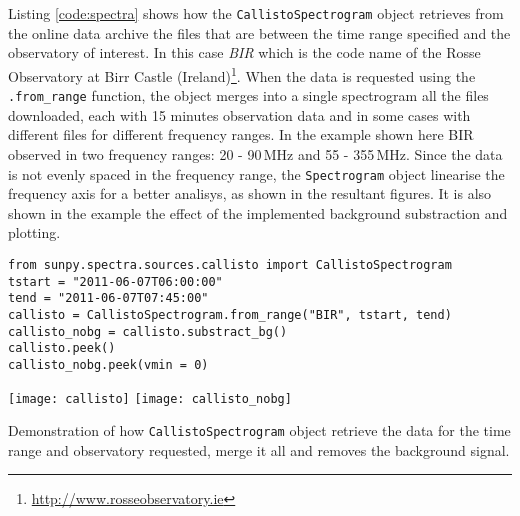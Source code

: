 Listing \ref{code:spectra} shows how the \texttt{CallistoSpectrogram} object retrieves
from the online data archive the files that are between the time range specified and
the observatory of interest.  In this case \textit{BIR} which is the code name of the
Rosse Observatory at Birr Castle (Ireland)\footnote{\url{http://www.rosseobservatory.ie}}.
When the data is requested using the \texttt{.from\_range} function, the object merges
into a single spectrogram all the files downloaded, each with 15 minutes observation data 
and in some cases with different files for different frequency ranges.  
In the example shown here BIR observed in two frequency ranges: 20 - 90\,MHz and 55 - 355\,MHz.
Since the data is not evenly spaced in the frequency range, the \texttt{Spectrogram} object
linearise the frequency axis for a better analisys, as shown in the resultant figures.
It is also shown in the example the effect of the implemented background substraction and
plotting.

\begin{listing}[h]
\begin{verbatim}
from sunpy.spectra.sources.callisto import CallistoSpectrogram
tstart = "2011-06-07T06:00:00"
tend = "2011-06-07T07:45:00"
callisto = CallistoSpectrogram.from_range("BIR", tstart, tend)
callisto_nobg = callisto.substract_bg()
callisto.peek()
callisto_nobg.peek(vmin = 0)
\end{verbatim}
\texttt{[image: callisto]} %
\texttt{[image: callisto\_nobg]}
\caption{Demonstration of how \texttt{CallistoSpectrogram} object retrieve the data
for the time range and observatory requested, merge it all and removes the background
signal.}
\label{code:spectra}
\end{listing}


